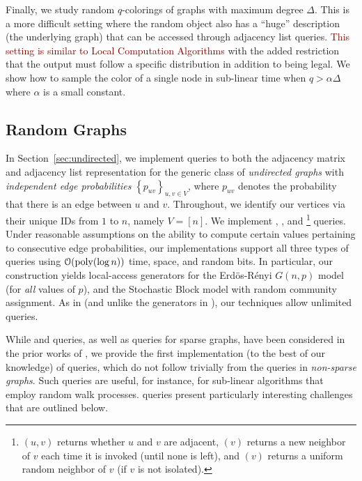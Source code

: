 Finally, we study random $q$-colorings of graphs with maximum degree $\Delta$.
This is a more difficult setting where the random object also has a ``huge'' description (the underlying graph)
that can be accessed through adjacency list queries.
\textcolor{Maroon}{This setting is similar to Local Computation Algorithms \cite{LCA, LCA_space_efficient}}
with the added restriction that the output must follow a specific distribution in addition to being legal.
We show how to sample the color of a single node in sub-linear time when $q > \alpha\Delta$ where $\alpha$ is a small constant.




\subsection{Random Graphs}%
\label{sec:random_graphs}
In Section~\ref{sec:undirected}, we implement queries to both the adjacency matrix and adjacency list representation
for the generic class of \emph{undirected graphs} with {\em independent edge probabilities} $\left\{ p_{uv} \right\}_{u,v\in V}$,
where $p_{uv}$ denotes the probability that there is an edge between $u$ and $v$.
Throughout, we identify our vertices via their unique IDs from $1$ to $n$, namely $V = [n]$.
We implement , , and 
\footnote{$(u,v)$ returns whether $u$ and $v$ are adjacent, $(v)$ returns a new neighbor of $v$ each time
it is invoked (until none is left), and $(v)$ returns a uniform random neighbor of $v$ (if $v$ is not isolated).} queries.
Under reasonable assumptions on the ability to compute certain values pertaining to consecutive edge probabilities,
our implementations support all three types of queries using $\mathcal{O}(\mathrm{poly}(\log n))$ time, space, and random bits.
In particular, our construction yields local-access generators for the Erd\"{o}s-R\'{e}nyi $G(n,p)$ model (for \emph{all} values of $p$),
and the Stochastic Block model with random community assignment.
As in \cite{reut} (and unlike the generators in \cite{huge_old,huge,sparse}), our techniques allow unlimited queries.

While  and  queries, as well as  queries for sparse graphs,
have been considered in the prior works of \cite{reut, huge_old, huge, sparse}, we provide the first implementation (to the best of our knowledge)
of  queries, which do not follow trivially from the  queries in \emph{non-sparse graphs}.
Such queries are useful, for instance, for sub-linear algorithms that employ random walk processes.
 queries present particularly interesting challenges that are outlined below.



